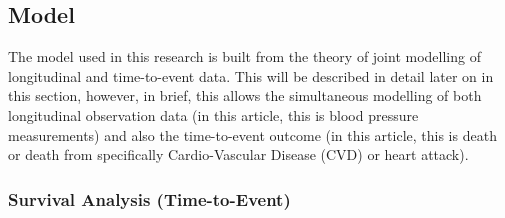 \documentclass[
]{article}
\begin{document}
\hypertarget{model}{%
\subsection{Model}\label{model}}

The model used in this research is built from the theory of joint
modelling of longitudinal and time-to-event data. This will be described
in detail later on in this section, however, in brief, this allows the
simultaneous modelling of both longitudinal observation data (in this
article, this is blood pressure measurements) and also the time-to-event
outcome (in this article, this is death or death from specifically
Cardio-Vascular Disease (CVD) or heart attack).

\hypertarget{survival-analysis-time-to-event}{%
\subsubsection{Survival Analysis
(Time-to-Event)}\label{survival-analysis-time-to-event}}
\end{document}
